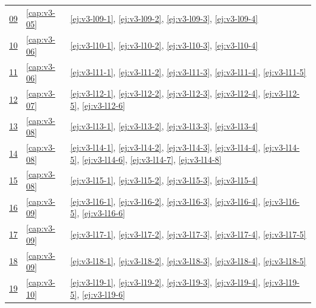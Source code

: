 {\begin{longtable}{@{}p{}p{}p{}@{}}
\href{https://drive.google.com/file/d/1LLIdMmCdP1_NxtgVYA9FAZHp4P5JC33b/view?usp=drivesdk}{09} & \ref{cap:v3-05} & \ref{ej:v3-l09-1}, \ref{ej:v3-l09-2}, \ref{ej:v3-l09-3}, \ref{ej:v3-l09-4} \\
\href{https://drive.google.com/file/d/1iG4qfJjG0NeEibgmJj65V5sQjv6lrkWB/view?usp=drivesdk}{10} & \ref{cap:v3-06} & \ref{ej:v3-l10-1}, \ref{ej:v3-l10-2}, \ref{ej:v3-l10-3}, \ref{ej:v3-l10-4} \\
\href{https://drive.google.com/file/d/17ZWG7fZuyXUSjQ6UnkKp7qtpGVBEhj_F/view?usp=drivesdk}{11} & \ref{cap:v3-06} & \ref{ej:v3-l11-1}, \ref{ej:v3-l11-2}, \ref{ej:v3-l11-3}, \ref{ej:v3-l11-4}, \ref{ej:v3-l11-5} \\
\href{https://drive.google.com/file/d/1MJJkGgIgdIMuydDXlpVE04Wt3oSDaAnO/view?usp=drivesdk}{12} & \ref{cap:v3-07} & \ref{ej:v3-l12-1}, \ref{ej:v3-l12-2}, \ref{ej:v3-l12-3}, \ref{ej:v3-l12-4}, \ref{ej:v3-l12-5}, \ref{ej:v3-l12-6} \\
\href{https://drive.google.com/file/d/1DsQNqkJNGYkYC-QBJMJZMqzS8PiavMDG/view?usp=drivesdk}{13} & \ref{cap:v3-08} & \ref{ej:v3-l13-1}, \ref{ej:v3-l13-2}, \ref{ej:v3-l13-3}, \ref{ej:v3-l13-4} \\
\href{https://drive.google.com/file/d/1YWA5VPrKVL6aVmfI-KQwg9lcC91j_Bm6/view?usp=drivesdk}{14} & \ref{cap:v3-08} & \ref{ej:v3-l14-1}, \ref{ej:v3-l14-2}, \ref{ej:v3-l14-3}, \ref{ej:v3-l14-4}, \ref{ej:v3-l14-5}, \ref{ej:v3-l14-6}, \ref{ej:v3-l14-7}, \ref{ej:v3-l14-8} \\
\href{https://drive.google.com/file/d/17912sFIb0nnYwgkhT77X8PO2qExqkz-i/view?usp=drivesdk}{15} & \ref{cap:v3-08} & \ref{ej:v3-l15-1}, \ref{ej:v3-l15-2}, \ref{ej:v3-l15-3}, \ref{ej:v3-l15-4} \\
\href{https://drive.google.com/file/d/13Srb0Z9QIk18Ht9NN4JYnGspWWr8sLvE/view?usp=drivesdk}{16} & \ref{cap:v3-09} & \ref{ej:v3-l16-1}, \ref{ej:v3-l16-2}, \ref{ej:v3-l16-3}, \ref{ej:v3-l16-4}, \ref{ej:v3-l16-5}, \ref{ej:v3-l16-6} \\
\href{https://drive.google.com/file/d/1uDtOjIEfL6C4D29lhK8uk6vfp5Cv2hNn/view?usp=drivesdk}{17} & \ref{cap:v3-09} & \ref{ej:v3-l17-1}, \ref{ej:v3-l17-2}, \ref{ej:v3-l17-3}, \ref{ej:v3-l17-4}, \ref{ej:v3-l17-5} \\
\href{https://drive.google.com/file/d/1mMXIdtvO-oxRIH1RBs1Gd3ZpIw4uL4uq/view?usp=drivesdk}{18} & \ref{cap:v3-09} & \ref{ej:v3-l18-1}, \ref{ej:v3-l18-2}, \ref{ej:v3-l18-3}, \ref{ej:v3-l18-4}, \ref{ej:v3-l18-5} \\
\href{https://drive.google.com/file/d/17J2_OKANydiG6yQXCGVu94N00nB-DIMV/view?usp=drivesdk}{19} & \ref{cap:v3-10} & \ref{ej:v3-l19-1}, \ref{ej:v3-l19-2}, \ref{ej:v3-l19-3}, \ref{ej:v3-l19-4}, \ref{ej:v3-l19-5}, \ref{ej:v3-l19-6} \\

\end{longtable}}
